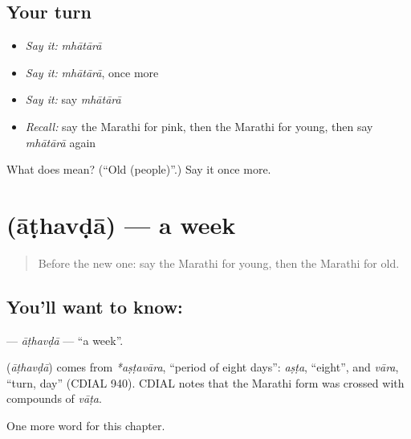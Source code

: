 \subsection*{Your turn}
\begin{itemize}
\raggedright
  \item \emph{Say it:} \emph{mhātārā}
  \item \emph{Say it:} \emph{mhātārā}, once more
  \item \emph{Say it:} say \emph{mhātārā}
  \item \emph{Recall:} say the Marathi for pink, then the Marathi for young, then say \emph{mhātārā} again
\end{itemize}

\begin{tcolorbox}[breakable,colback=teal!4,colframe=teal!35!black,title={Before you move on}]
What does  mean? (\textquotedblleft{}Old (people)\textquotedblright{}.) Say it once more.
\end{tcolorbox}
\section[\texorpdfstring{\mr{आठवडा} (āṭhavḍā)}{आठवडा (āṭhavḍā)}]{ (āṭhavḍā) — a week}

\label{lesson:MR-C109-athavda}



\begin{quote}
Before the new one: say the Marathi for young, then the Marathi for old.
\end{quote}

\subsection*{You'll want to know: }
\textbf{} — \emph{āṭhavḍā} — \textquotedblleft{}a week\textquotedblright{}.

\begin{cousinweb}
\textbf{} (\emph{āṭhavḍā}) comes from \emph{*aṣṭavāra}, \textquotedblleft{}period of eight days\textquotedblright{}: \emph{aṣṭa}, \textquotedblleft{}eight\textquotedblright{}, and \emph{vāra}, \textquotedblleft{}turn, day\textquotedblright{} (CDIAL 940). CDIAL notes that the Marathi form was crossed with compounds of \emph{vāṭa}.
\end{cousinweb}

\begin{grammarlens}[title={What you've built}]
One more word for this chapter.
\end{grammarlens}

